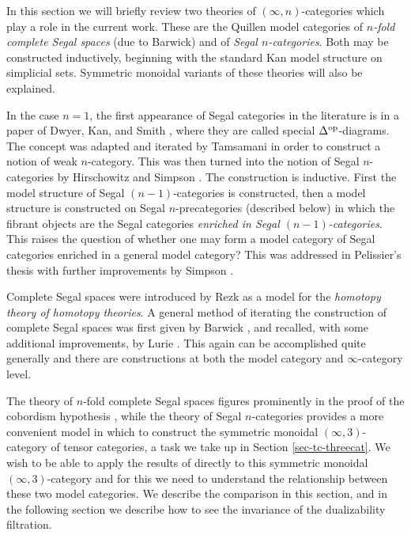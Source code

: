 \documentclass{amsart}
\begin{document}


In this section we will briefly review two theories of $(\infty,n)$-categories which play a role in the current work. These are the Quillen model categories of {\em $n$-fold complete Segal spaces} (due to Barwick) and of {\em Segal $n$-categories}. Both may be constructed inductively, beginning with the standard Kan model structure on simplicial sets. Symmetric monoidal variants of these theories will also be explained. 

In the case $n=1$, the first appearance of Segal categories in the literature is in a paper of Dwyer, Kan, and Smith \cite{MR984042}, where they are called special $\Delta^{\mathrm{op}}$-diagrams. The concept was adapted and iterated by Tamsamani \cite{Tamsamani:thesis} in order to construct a notion of weak $n$-category. This was then turned into the notion of Segal $n$-categories by Hirschowitz and Simpson \cite{9807049}. The construction is inductive.  First the model structure of Segal $(n-1)$-categories is constructed, then a model structure is constructed on Segal $n$-precategories (described below) in which the fibrant objects are the Segal categories {\em enriched in Segal $(n-1)$-categories}. This raises the question of whether one may form a model category of Segal categories enriched in a general model category? This was addressed in Pelissier's thesis \cite{Pelissier:thesis} with further improvements by Simpson \cite{1001.4071}.  

Complete Segal spaces were introduced by Rezk \cite{MR1804411} as a model for the {\em homotopy theory of homotopy theories}.  A general method of iterating the construction of complete Segal spaces was first given by Barwick \cite{Barwick:thesis}, and recalled, with some additional improvements, by Lurie \cite{0905.0462, MR2555928}. This again can be accomplished quite generally and there are constructions at both the model category and $\infty$-category level. 

The theory of $n$-fold complete Segal spaces figures prominently in the proof of the cobordism hypothesis \cite{MR2555928}, while the theory of Segal $n$-categories provides a more convenient model in which to construct the symmetric monoidal $(\infty,3)$-category of tensor categories, a task we take up in Section \ref{sec-tc-threecat}. We wish to be able to apply the results of \cite{MR2555928} directly to this symmetric monoidal $(\infty,3)$-category and for this we need to understand the relationship between these two model categories. We describe the comparison in this section, and in the following section we describe how to see the invariance of the dualizability filtration.  
\end{document}
